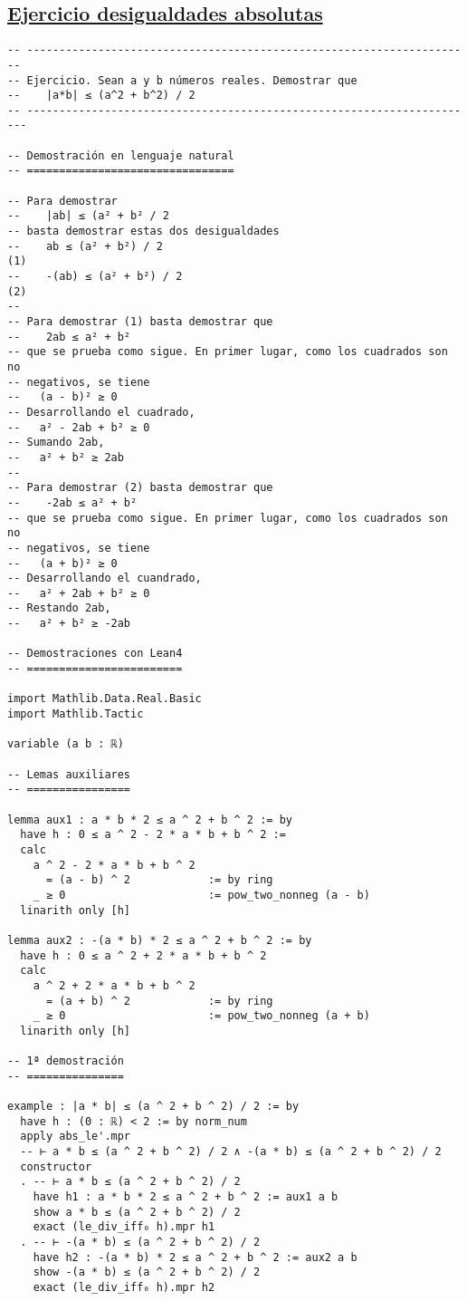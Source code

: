 \subsection{\href{./src/Basicos/Ejercicio\_desigualdades\_absolutas.lean}{Ejercicio desigualdades absolutas}}
\label{sec:org34b74c0}
\begin{verbatim}
-- ---------------------------------------------------------------------
-- Ejercicio. Sean a y b números reales. Demostrar que
--    |a*b| ≤ (a^2 + b^2) / 2
-- ----------------------------------------------------------------------

-- Demostración en lenguaje natural
-- ================================

-- Para demostrar
--    |ab| ≤ (a² + b² / 2
-- basta demostrar estas dos desigualdades
--    ab ≤ (a² + b²) / 2                                              (1)
--    -(ab) ≤ (a² + b²) / 2                                           (2)
--
-- Para demostrar (1) basta demostrar que
--    2ab ≤ a² + b²
-- que se prueba como sigue. En primer lugar, como los cuadrados son no
-- negativos, se tiene
--   (a - b)² ≥ 0
-- Desarrollando el cuadrado,
--   a² - 2ab + b² ≥ 0
-- Sumando 2ab,
--   a² + b² ≥ 2ab
--
-- Para demostrar (2) basta demostrar que
--    -2ab ≤ a² + b²
-- que se prueba como sigue. En primer lugar, como los cuadrados son no
-- negativos, se tiene
--   (a + b)² ≥ 0
-- Desarrollando el cuandrado,
--   a² + 2ab + b² ≥ 0
-- Restando 2ab,
--   a² + b² ≥ -2ab

-- Demostraciones con Lean4
-- ========================

import Mathlib.Data.Real.Basic
import Mathlib.Tactic

variable (a b : ℝ)

-- Lemas auxiliares
-- ================

lemma aux1 : a * b * 2 ≤ a ^ 2 + b ^ 2 := by
  have h : 0 ≤ a ^ 2 - 2 * a * b + b ^ 2 :=
  calc
    a ^ 2 - 2 * a * b + b ^ 2
      = (a - b) ^ 2            := by ring
    _ ≥ 0                      := pow_two_nonneg (a - b)
  linarith only [h]

lemma aux2 : -(a * b) * 2 ≤ a ^ 2 + b ^ 2 := by
  have h : 0 ≤ a ^ 2 + 2 * a * b + b ^ 2
  calc
    a ^ 2 + 2 * a * b + b ^ 2
      = (a + b) ^ 2            := by ring
    _ ≥ 0                      := pow_two_nonneg (a + b)
  linarith only [h]

-- 1ª demostración
-- ===============

example : |a * b| ≤ (a ^ 2 + b ^ 2) / 2 := by
  have h : (0 : ℝ) < 2 := by norm_num
  apply abs_le'.mpr
  -- ⊢ a * b ≤ (a ^ 2 + b ^ 2) / 2 ∧ -(a * b) ≤ (a ^ 2 + b ^ 2) / 2
  constructor
  . -- ⊢ a * b ≤ (a ^ 2 + b ^ 2) / 2
    have h1 : a * b * 2 ≤ a ^ 2 + b ^ 2 := aux1 a b
    show a * b ≤ (a ^ 2 + b ^ 2) / 2
    exact (le_div_iff₀ h).mpr h1
  . -- ⊢ -(a * b) ≤ (a ^ 2 + b ^ 2) / 2
    have h2 : -(a * b) * 2 ≤ a ^ 2 + b ^ 2 := aux2 a b
    show -(a * b) ≤ (a ^ 2 + b ^ 2) / 2
    exact (le_div_iff₀ h).mpr h2


\end{verbatim}
